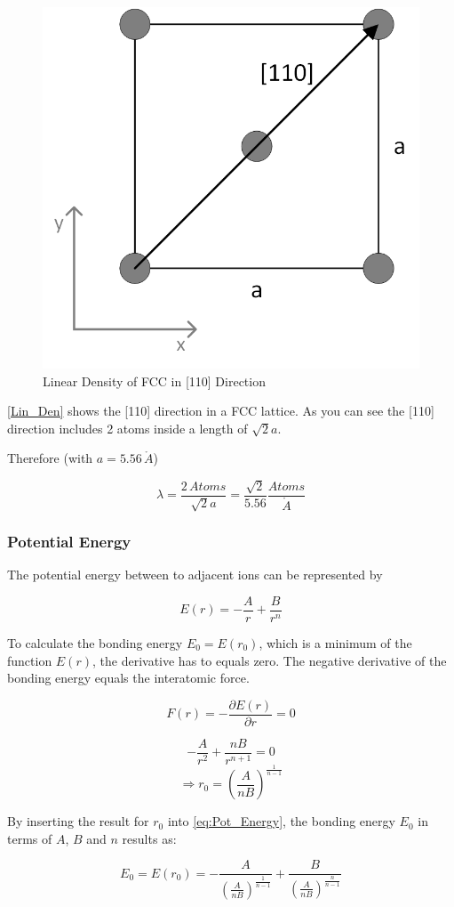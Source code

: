 \begin{figure}[H]
	\centering
	\includegraphics[width=0.5\linewidth]{Graphics/Chapter1/Lin_Den}
	\caption{Linear Density of FCC in [110] Direction}
	\label{fig:Lin_Den}
\end{figure}

\autoref{Lin_Den} shows the [110] direction in a FCC lattice.
As you can see the [110] direction includes 2 atoms inside a 
length of $\sqrt{2}a$.

Therefore  (with $a = 5.56 \, \mathring{A}$)

$$\lambda = \frac{2 \, Atoms}{\sqrt{2}a} = \frac{\sqrt{2}}{5.56} \frac{Atoms}{\mathring{A}}$$

\subsubsection*{Potential Energy}

The potential energy between to adjacent ions can be represented by

\begin{equation}
	E(r) = - \frac{A}{r} + \frac{B}{r^n}
	\label{eq:Pot_Energy}
\end{equation}


To calculate the bonding energy $E_0 = E(r_0)$, which is a minimum of the function $E(r)$,
the derivative has to equals zero.
The negative derivative of the bonding energy equals the interatomic force.

$$F(r) = - \frac{\partial E(r)}{\partial r} = 0$$

$$-\frac{A}{r^2} + \frac{nB}{r^{n+1}} = 0$$
$$\Rightarrow r_0 = \left( \frac{A}{nB} \right)^{\frac{1}{n-1}}$$

By inserting the result for $r_0$ into \autoref{eq:Pot_Energy}, the bonding energy $E_0$ in terms of $A$, $B$ and $n$ results as:

$$E_0 = E(r_0) = - \frac{A}{\left( \frac{A}{nB} \right)^{\frac{1}{n-1}}} + 
				\frac{B}{\left( \frac{A}{nB} \right)^{\frac{n}{n-1}}}$$

